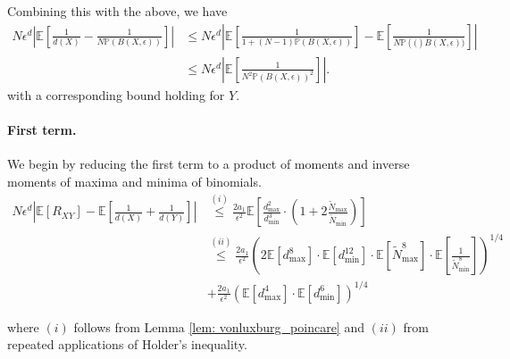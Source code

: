 \documentclass{article}
\newcommand{\Expect}[1]{\mathbb{E}\left[ #1 \right]}
\newcommand{\Prob}[1]{\mathbb{P}\left( #1 \right)}
\newcommand{\abs}[1]{\left \lvert #1 \right \rvert}
\theoremstyle{alden}
\theoremstyle{definition}
\theoremstyle{remark}
\begin{document}
Combining this with the above, we have
\begin{align*}
N \epsilon^d \abs{\Expect{\frac{1}{d(X)} - \frac{1}{N \Prob{B(X,\epsilon)} } } } & \leq N \epsilon^d \abs{ \Expect{\frac{1}{1 + (N - 1)\Prob{B(X,\epsilon)}}}  - \Expect{\frac{1}{N\Prob(B(X, \epsilon))}}} \\
& \leq N \epsilon^d \abs{ \Expect{\frac{1}{N^2 \Prob{B(X, \epsilon)}^2}} }.
\end{align*}
with a corresponding bound holding for $Y$. 

\paragraph{First term.}
We begin by reducing the first term to a product of moments and inverse moments of maxima and minima of binomials.
\begin{align*}
N \epsilon^d \abs{\Expect{R_{XY}} - \Expect{\frac{1}{d(X)} + \frac{1}{d(Y)}}} & \overset{(i)}{\leq} \frac{2 a_1}{\epsilon^2} \Expect{\frac{d^2_{\max}}{d^3_{\min}} \cdot (1 + 2 \frac{\widetilde{N}_{\max}}{\widetilde{N}_{\min}})} \\
& \overset{(ii)}{\leq} \frac{2 a_1}{\epsilon^2} \left(2 \Expect{d_{\max}^8} \cdot \Expect{ d_{\min}^{12} } \cdot \Expect{ \widetilde{N}_{\max}^8} \cdot \Expect{\frac{1}{\widetilde{N}_{\min}^8}} \right)^{1/4}\\
& + \frac{2 a_1}{\epsilon^2} \left( \Expect{d_{\max}^4} \cdot \Expect{d_{\min}^6} \right)^{1/4}
\end{align*}

where $(i)$ follows from Lemma \ref{lem: vonluxburg_poincare} and $(ii)$ from repeated applications of Holder's inequality.
\end{document}
